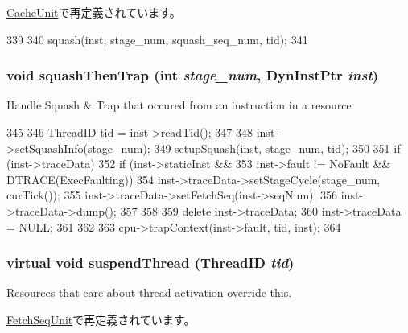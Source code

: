 \hyperlink{classCacheUnit_ae2d6fba25ece343caad6eb029a4a3b5b}{CacheUnit}で再定義されています。


\begin{DoxyCode}
339 {
340     squash(inst, stage_num, squash_seq_num, tid);    
341 }
\end{DoxyCode}
\hypertarget{classResource_ac04c1a8a5c1212f9bbdc1ce83b1da882}{
\subsubsection[{squashThenTrap}]{\setlength{\rightskip}{0pt plus 5cm}void squashThenTrap (int {\em stage\_\-num}, \/  {\bf DynInstPtr} {\em inst})}}
\label{classResource_ac04c1a8a5c1212f9bbdc1ce83b1da882}
Handle Squash \& Trap that occured from an instruction in a resource 


\begin{DoxyCode}
345 {
346     ThreadID tid = inst->readTid();
347 
348     inst->setSquashInfo(stage_num);
349     setupSquash(inst, stage_num, tid);
350 
351     if (inst->traceData) {
352         if (inst->staticInst &&
353             inst->fault != NoFault && DTRACE(ExecFaulting)) {
354             inst->traceData->setStageCycle(stage_num, curTick());
355             inst->traceData->setFetchSeq(inst->seqNum);
356             inst->traceData->dump();
357         }
358 
359         delete inst->traceData;
360         inst->traceData = NULL;
361     }
362 
363     cpu->trapContext(inst->fault, tid, inst);
364 }
\end{DoxyCode}
\hypertarget{classResource_ad2f3fddbc6dd67ef5e3a84cd7a9814e6}{
\subsubsection[{suspendThread}]{\setlength{\rightskip}{0pt plus 5cm}virtual void suspendThread ({\bf ThreadID} {\em tid})}}
\label{classResource_ad2f3fddbc6dd67ef5e3a84cd7a9814e6}
Resources that care about thread activation override this. 

\hyperlink{classFetchSeqUnit_aee7a498a20266fbfbc6aa3f165577b68}{FetchSeqUnit}で再定義されています。


